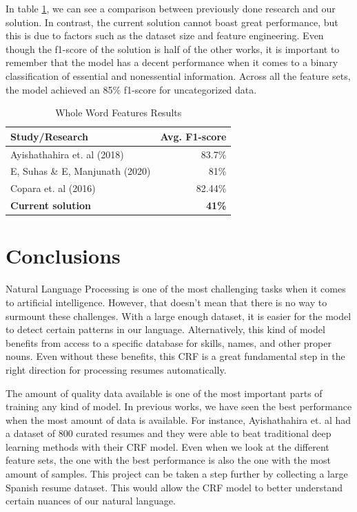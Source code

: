 \documentclass[a4paper, conference]{ieeeconf}
\begin{document}
  \medskip
  In table \ref{table:7}, we can see a comparison between previously done
  research and our solution. In contrast, the current solution cannot boast
  great performance, but this is due to factors such as the dataset size and
  feature engineering. Even though the f1-score of the solution is half of
  the other works, it is important to remember that the model has a decent
  performance when it comes to a binary classification of essential and
  nonessential information. Across all the feature sets, the model achieved an
  85\% f1-score for uncategorized data.
  \begin{table}[H]
    \centering
    \begin{tabular}{|l|r|}
         \hline
         \textbf{Study/Research} & \textbf{Avg. F1-score} \\
         \hline
             Ayishathahira et. al (2018) \cite{Ayishathahira2018a} & 83.7\% \\
             E, Suhas \& E, Manjunath (2020) \cite{E*2020} & 81\% \\
             Copara et. al (2016) \cite{Copara2016} & 82.44\% \\
         \hline
             \textbf{Current solution} & \textbf{41\%} \\
         \hline
    \end{tabular}
    \caption{Whole Word Features Results}
    \label{table:7}
  \end{table}

  \section{Conclusions}
  Natural Language Processing is one of the most challenging tasks when it
  comes to artificial intelligence. However, that doesn't mean that there is no
  way to surmount these challenges. With a large enough dataset, it is easier
  for the model to detect certain patterns in our language. Alternatively, this
  kind of model benefits from access to a specific database for skills, names,
  and other proper nouns. Even without these benefits, this CRF is a great
  fundamental step in the right direction for processing resumes automatically. 

  The amount of quality data available is one of the most important parts of
  training any kind of model. In previous works, we have seen the best
  performance when the most amount of data is available. For instance,
  Ayishathahira et. al \cite{Ayishathahira2018a} had a dataset of 800 curated
  resumes and they were able to beat traditional deep learning methods with
  their CRF model. Even when we look at the different feature sets, the one
  with the best performance is also the one with the most amount of samples.
  This project can be taken a step further by collecting a large Spanish resume
  dataset. This would allow the CRF model to better understand certain nuances
  of our natural language.
\end{document}
